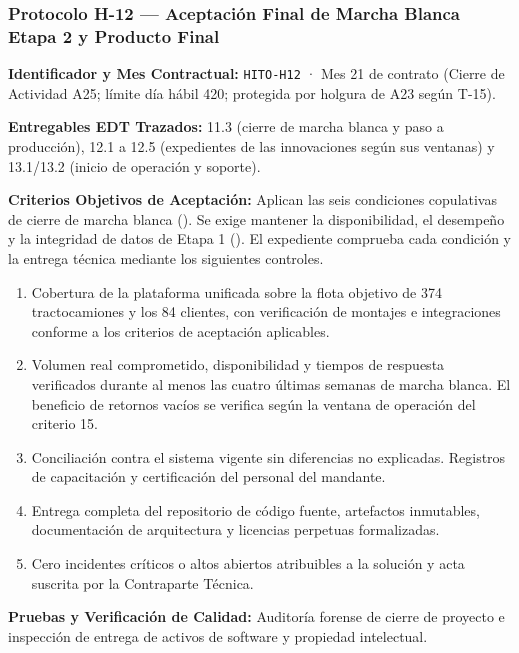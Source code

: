 \subsubsection*{Protocolo H-12 — Aceptación Final de Marcha Blanca Etapa 2 y Producto Final}\label{sec:9-proto-h12}
\par\noindent\textbf{Identificador y Mes Contractual:} \texttt{HITO-H12} · Mes 21 de contrato (Cierre de Actividad A25; límite día hábil 420; protegida por holgura de A23 según T-15).\par
\par\noindent\textbf{Entregables EDT Trazados:} 11.3 (cierre de marcha blanca y paso a producción), 12.1 a 12.5 (expedientes de las innovaciones según sus ventanas) y 13.1/13.2 (inicio de operación y soporte).\par
\par\noindent\textbf{Criterios Objetivos de Aceptación:} Aplican las seis condiciones copulativas de cierre de marcha blanca (). Se exige mantener la disponibilidad, el desempeño y la integridad de datos de Etapa 1 (). El expediente comprueba cada condición y la entrega técnica mediante los siguientes controles.
\begin{enumerate}
  \item Cobertura de la plataforma unificada sobre la flota objetivo de 374 tractocamiones y los 84 clientes, con verificación de montajes e integraciones conforme a los criterios de aceptación aplicables.
  \item Volumen real comprometido, disponibilidad y tiempos de respuesta verificados durante al menos las cuatro últimas semanas de marcha blanca. El beneficio de retornos vacíos se verifica según la ventana de operación del criterio 15.
  \item Conciliación contra el sistema vigente sin diferencias no explicadas. Registros de capacitación y certificación del personal del mandante.
  \item Entrega completa del repositorio de código fuente, artefactos inmutables, documentación de arquitectura y licencias perpetuas formalizadas.
  \item Cero incidentes críticos o altos abiertos atribuibles a la solución y acta suscrita por la Contraparte Técnica.
\end{enumerate}
\par\noindent\textbf{Pruebas y Verificación de Calidad:} Auditoría forense de cierre de proyecto e inspección de entrega de activos de software y propiedad intelectual.\par
